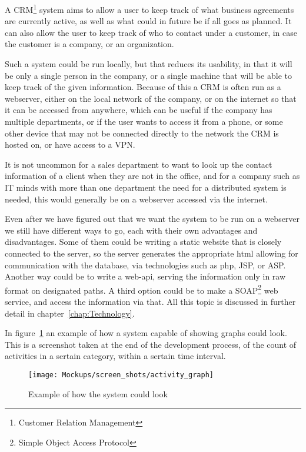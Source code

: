 A CRM\footnote{Customer Relation Management} system aims to allow a user to keep
track of what business agreements are currently active, as well as what could in
future be if all goes as planned. It can also allow the user to keep track of
who to contact under a customer, in case the customer is a company, or an
organization. 

Such a system could be run locally, but that reduces its usability, in that it
will be only a single person in the company, or a single machine that will be
able to keep track of the given information. Because of this a CRM is often run
as a webserver, either on the local network of the company, or on the internet
so that it can be accessed from anywhere, which can be useful if the company has
multiple departments, or if the user wants to access it from a phone, or some
other device that may not be connected directly to the network the CRM is hosted
on, or have access to a VPN. 

It is not uncommon for a sales department to want to look up the contact
information of a client when they are not in the office, and for a company such
as IT minds with more than one department the need for a distributed system is
needed, this would generally be on a webserver accessed via the internet. 

Even after we have figured out that we want the system to be run on a webserver
we still have different ways to go, each with their own advantages and
disadvantages. Some of them could be writing a static website that is closely
connected to the server, so the server generates the appropriate html allowing
for communication with the database, via technologies such as php, JSP, or ASP.
Another way could be to write a web-api, serving the information only in raw
format on designated paths. A third option could be to make a
SOAP\footnote{Simple Object Access Protocol} web service, and access the
information via that. All this topic is discussed in further detail in
chapter~\ref{chap:Technology}. 

In figure~\ref{fig:sys_example} an example of how a system capable of showing
graphs could look. This is a screenshot taken at the end of the development
process, of the count of activities in a sertain category, within a sertain time interval.

\begin{figure}[h]
\centering
\texttt{[image: Mockups/screen\_shots/activity\_graph]}
\caption{Example of how the system could look}
\label{fig:sys_example}
\end{figure}

